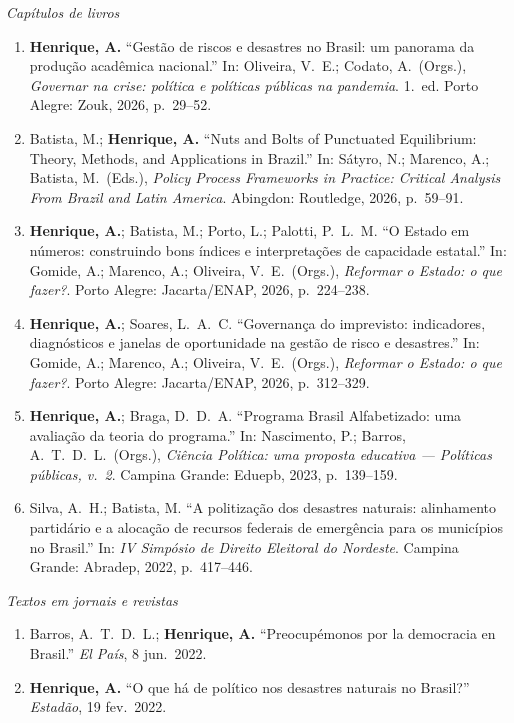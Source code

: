 \documentclass[11pt]{article}
\newcommand{\cvsubsection}[1]{\vspace{0.9em}\textit{#1}\par\vspace{0.35em}}
\begin{document}
\cvsubsection{Capítulos de livros}
\begin{enumerate}[leftmargin=0.3in,itemsep=0.4em,parsep=0pt]
\item \textbf{Henrique, A.} ``Gestão de riscos e desastres no Brasil: um panorama da produção acadêmica nacional.'' In: Oliveira, V.\ E.; Codato, A.\ (Orgs.), \textit{Governar na crise: política e políticas públicas na pandemia}. 1.\ ed. Porto Alegre: Zouk, 2026, p.\ 29--52.
\item Batista, M.; \textbf{Henrique, A.} ``Nuts and Bolts of Punctuated Equilibrium: Theory, Methods, and Applications in Brazil.'' In: Sátyro, N.; Marenco, A.; Batista, M.\ (Eds.), \textit{Policy Process Frameworks in Practice: Critical Analysis From Brazil and Latin America}. Abingdon: Routledge, 2026, p.\ 59--91.
\item \textbf{Henrique, A.}; Batista, M.; Porto, L.; Palotti, P.\ L.\ M. ``O Estado em números: construindo bons índices e interpretações de capacidade estatal.'' In: Gomide, A.; Marenco, A.; Oliveira, V.\ E.\ (Orgs.), \textit{Reformar o Estado: o que fazer?}. Porto Alegre: Jacarta/ENAP, 2026, p.\ 224--238.
\item \textbf{Henrique, A.}; Soares, L.\ A.\ C. ``Governança do imprevisto: indicadores, diagnósticos e janelas de oportunidade na gestão de risco e desastres.'' In: Gomide, A.; Marenco, A.; Oliveira, V.\ E.\ (Orgs.), \textit{Reformar o Estado: o que fazer?}. Porto Alegre: Jacarta/ENAP, 2026, p.\ 312--329.
\item \textbf{Henrique, A.}; Braga, D.\ D.\ A. ``Programa Brasil Alfabetizado: uma avaliação da teoria do programa.'' In: Nascimento, P.; Barros, A.\ T.\ D.\ L.\ (Orgs.), \textit{Ciência Política: uma proposta educativa --- Políticas públicas, v.\ 2}. Campina Grande: Eduepb, 2023, p.\ 139--159.
\item Silva, A.\ H.; Batista, M. ``A politização dos desastres naturais: alinhamento partidário e a alocação de recursos federais de emergência para os municípios no Brasil.'' In: \textit{IV Simpósio de Direito Eleitoral do Nordeste}. Campina Grande: Abradep, 2022, p.\ 417--446.
\end{enumerate}

\cvsubsection{Textos em jornais e revistas}
\begin{enumerate}[leftmargin=0.3in,itemsep=0.4em,parsep=0pt]
\item Barros, A.\ T.\ D.\ L.; \textbf{Henrique, A.} ``Preocupémonos por la democracia en Brasil.'' \textit{El País}, 8 jun.\ 2022.
\item \textbf{Henrique, A.} ``O que há de político nos desastres naturais no Brasil?'' \textit{Estadão}, 19 fev.\ 2022.
\end{enumerate}
\end{document}

